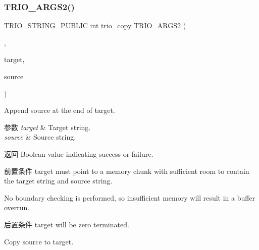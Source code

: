 \subsubsection{\texorpdfstring{T\+R\+I\+O\+\_\+\+A\+R\+G\+S2()}{TRIO\_ARGS2()}\hspace{0.1cm}{\footnotesize\ttfamily [1/9]}}
{\footnotesize\ttfamily T\+R\+I\+O\+\_\+\+S\+T\+R\+I\+N\+G\+\_\+\+P\+U\+B\+L\+IC int trio\+\_\+copy T\+R\+I\+O\+\_\+\+A\+R\+G\+S2 (\begin{DoxyParamCaption}\item[{(\hyperlink{interfacevoid}{target}, \hyperlink{structsource}{source})}]{,  }\item[{char $\ast$}]{target,  }\item[{T\+R\+I\+O\+\_\+\+C\+O\+N\+ST char $\ast$}]{source }\end{DoxyParamCaption})}

Append {\ttfamily source} at the end of {\ttfamily target}.


\begin{DoxyParams}{参数}
{\em target} & Target string. \\
\hline
{\em source} & Source string. \\
\hline
\end{DoxyParams}
\begin{DoxyReturn}{返回}
Boolean value indicating success or failure.
\end{DoxyReturn}
\begin{DoxyPrecond}{前置条件}
{\ttfamily target} must point to a memory chunk with sufficient room to contain the {\ttfamily target} string and {\ttfamily source} string. 

No boundary checking is performed, so insufficient memory will result in a buffer overrun. 
\end{DoxyPrecond}
\begin{DoxyPostcond}{后置条件}
{\ttfamily target} will be zero terminated.
\end{DoxyPostcond}
Copy {\ttfamily source} to {\ttfamily target}.



